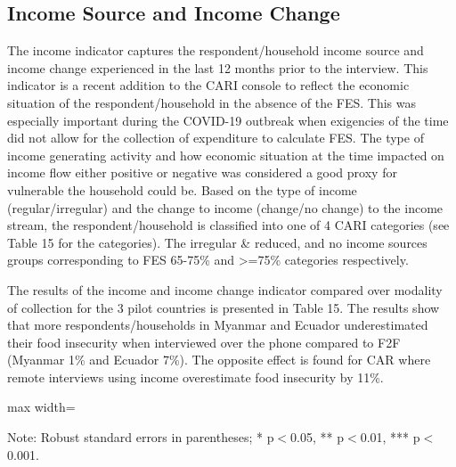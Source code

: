 \documentclass[11pt,harvard]{article}
\begin{document}
\pagebreak

\subsection{Income Source and Income Change}

The income indicator captures the respondent/household income source and income change experienced in the last 12 months prior to the interview. This indicator is a recent addition to the CARI console to reflect the economic situation of the respondent/household in the absence of the FES. This was especially important during the COVID-19 outbreak when exigencies of the time did not allow for the collection of expenditure to calculate FES. The type of income generating activity and how economic situation at the time impacted on income flow either positive or negative was considered a good proxy for vulnerable the household could be. Based on the type of income (regular/irregular) and the change to income (change/no change) to the income stream, the respondent/household is classified into one of 4 CARI categories (see Table 15 for the categories). The irregular \& reduced, and no income sources groups corresponding to FES 65-75\% and >=75\% categories respectively.

The results of the income and income change indicator compared over modality of collection for the 3 pilot countries is presented in Table 15. The results show that more respondents/households in Myanmar and Ecuador underestimated their food insecurity when interviewed over the phone compared to F2F (Myanmar 1\% and Ecuador 7\%). The opposite effect is found for CAR where remote interviews using income overestimate food insecurity by 11\%.    

\begin{table}[htbp]
	\centering
	\begin{adjustbox}{max width=\textwidth}
		\begin{threeparttable}
			\caption{Impact of Survey Modality on Income}
			\scriptsize
			 
			\label{tab:INC_Modality_All_Country}
			\begin{tablenotes}
				\item Note: Robust standard errors in parentheses; * p$<$0.05, ** p$<$0.01, *** p$<$0.001. 
			\end{tablenotes}
		\end{threeparttable}
	\end{adjustbox}
\end{table}
\end{document}
